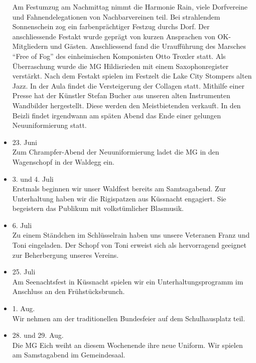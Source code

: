 \begin{history}
\begin{itemize}
        Am Festumzug am Nachmittag nimmt die Harmonie Rain, viele Dorfvereine
        und Fahnendelegationen von Nachbarvereinen teil. Bei strahlendem
        Sonnenschein zog ein farbenprächtiger Festzug durchs Dorf. Der
        anschliessende Festakt wurde geprägt von kurzen Ansprachen von
        OK-Mitgliedern und Gästen. Anschliessend fand die Uraufführung des
        Marsches \enquote{Free of Fog} des einheimischen Komponisten Otto
        Troxler statt. Als Überraschung wurde die MG Hildisrieden mit einem
        Saxophonregister verstärkt. Nach dem Festakt spielen im Festzelt die
        Lake City Stompers alten Jazz. In der Aula findet die Versteigerung der
        Collagen statt. Mithilfe einer Presse hat der Künstler Stefan Bucher aus
        unseren alten Instrumenten Wandbilder hergestellt. Diese werden den
        Meistbietenden verkauft. In den Beizli findet irgendwann am späten Abend
        das Ende einer gelungen Neuuniformierung statt.

        \item[]23. Juni\\
        Zum Chrampfer-Abend der Neuuniformierung ladet die MG in den Wagenschopf
        in der Waldegg ein.

        \item[]3. und 4. Juli\\
        Erstmals beginnen wir unser Waldfest bereits am Samtsagabend. Zur
        Unterhaltung haben wir die Rigispatzen aus Küssnacht engagiert. Sie
        begeistern das Publikum mit volkstümlicher Blasmusik.

        \item[]6. Juli\\
        Zu einem Ständchen im Schlüsselrain haben uns unsere Veteranen Franz und
        Toni eingeladen. Der Schopf von Toni erweist sich als hervorragend
        geeignet zur Beherbergung unseres Vereins.

        \item[]25. Juli\\
        Am Seenachtsfest in Küssnacht spielen wir ein Unterhaltungsprogramm im
        Anschluss an den Frühstücksbrunch.

        \item[]1. Aug.\\
        Wir nehmen am der traditionellen Bundesfeier auf dem Schulhausplatz
        teil.

        \item[]28. und 29. Aug.\\
        Die MG Eich weiht an diesem Wochenende ihre neue Uniform. Wir spielen am
        Samstagabend im Gemeindesaal.



    \end{itemize}

\end{history}
